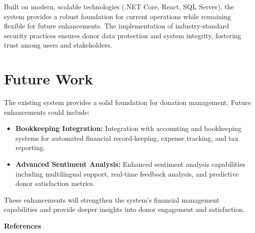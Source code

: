 Built on modern, scalable technologies (.NET Core, React, SQL Server), the system provides a robust foundation for current operations while remaining flexible for future enhancements. The implementation of industry-standard security practices ensures donor data protection and system integrity, fostering trust among users and stakeholders.

\section{Future Work}

The existing system provides a solid foundation for donation management. Future enhancements could include:

\begin{itemize}
    \item \textbf{Bookkeeping Integration:} Integration with accounting and bookkeeping systems for automated financial record-keeping, expense tracking, and tax reporting.
    \item \textbf{Advanced Sentiment Analysis:} Enhanced sentiment analysis capabilities including multilingual support, real-time feedback analysis, and predictive donor satisfaction metrics.
\end{itemize}

These enhancements will strengthen the system's financial management capabilities and provide deeper insights into donor engagement and satisfaction.

\renewcommand{\bibname}{References}

\cleardoublepage
\thispagestyle{empty}

\vspace*{\fill}
\begin{center}
    \Huge \bfseries References
\end{center}
\vspace*{\fill}





